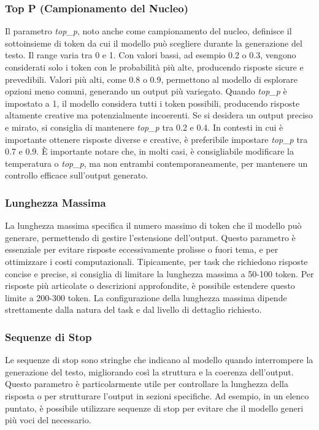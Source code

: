 \documentclass[target=mst,aauheader=,style=]{thud}
\begin{document}
\subsubsection{Top P (Campionamento del Nucleo)}
Il parametro \textit{top\_p}, noto anche come campionamento del nucleo, definisce il sottoinsieme di token da cui il modello può scegliere durante la generazione del testo. Il range varia tra 0 e 1. Con valori bassi, ad esempio 0.2 o 0.3, vengono considerati solo i token con le probabilità più alte, producendo risposte sicure e prevedibili. Valori più alti, come 0.8 o 0.9, permettono al modello di esplorare opzioni meno comuni, generando un output più variegato.
Quando \textit{top\_p} è impostato a 1, il modello considera tutti i token possibili, producendo risposte altamente creative ma potenzialmente incoerenti. Se si desidera un output preciso e mirato, si consiglia di mantenere \textit{top\_p} tra 0.2 e 0.4. In contesti in cui è importante ottenere risposte diverse e creative, è preferibile impostare \textit{top\_p} tra 0.7 e 0.9. È importante notare che, in molti casi, è consigliabile modificare la temperatura o \textit{top\_p}, ma non entrambi contemporaneamente, per mantenere un controllo efficace sull’output generato.

\subsubsection{Lunghezza Massima}
La lunghezza massima specifica il numero massimo di token che il modello può generare, permettendo di gestire l’estensione dell’output. Questo parametro è essenziale per evitare risposte eccessivamente prolisse o fuori tema, e per ottimizzare i costi computazionali.
Tipicamente, per task che richiedono risposte concise e precise, si consiglia di limitare la lunghezza massima a 50-100 token. Per risposte più articolate o descrizioni approfondite, è possibile estendere questo limite a 200-300 token. La configurazione della lunghezza massima dipende strettamente dalla natura del task e dal livello di dettaglio richiesto.

\subsubsection{Sequenze di Stop}
Le sequenze di stop sono stringhe che indicano al modello quando interrompere la generazione del testo, migliorando così la struttura e la coerenza dell’output. Questo parametro è particolarmente utile per controllare la lunghezza della risposta o per strutturare l’output in sezioni specifiche. Ad esempio, in un elenco puntato, è possibile utilizzare sequenze di stop per evitare che il modello generi più voci del necessario.
\end{document}
